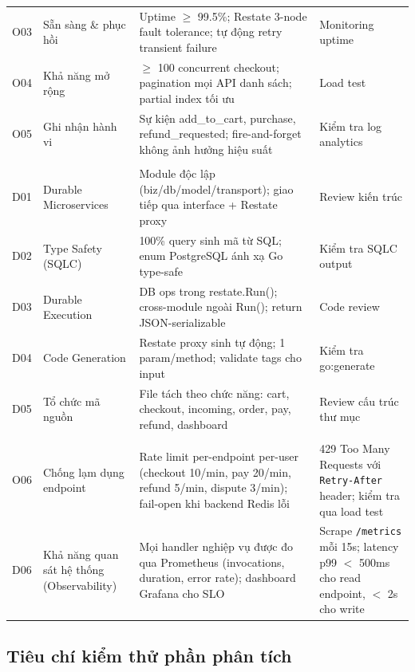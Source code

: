 \begin{longtable}{@{} c L{2.8cm} L{5cm} L{5cm} @{}}
O03 & Sẵn sàng \& phục hồi & Uptime $\geq$ 99.5\%; Restate 3-node fault tolerance; tự động retry transient failure & Monitoring uptime \\
O04 & Khả năng mở rộng & $\geq$ 100 concurrent checkout; pagination mọi API danh sách; partial index tối ưu & Load test \\
O05 & Ghi nhận hành vi & Sự kiện add\_to\_cart, purchase, refund\_requested; fire-and-forget không ảnh hưởng hiệu suất & Kiểm tra log analytics \\
 \\
D01 & Durable Microservices & Module độc lập (biz/db/model/transport); giao tiếp qua interface + Restate proxy & Review kiến trúc \\
D02 & Type Safety (SQLC) & 100\% query sinh mã từ SQL; enum PostgreSQL ánh xạ Go type-safe & Kiểm tra SQLC output \\
D03 & Durable Execution & DB ops trong restate.Run(); cross-module ngoài Run(); return JSON-serializable & Code review \\
D04 & Code Generation & Restate proxy sinh tự động; 1 param/method; validate tags cho input & Kiểm tra go:generate \\
D05 & Tổ chức mã nguồn & File tách theo chức năng: cart, checkout, incoming, order, pay, refund, dashboard & Review cấu trúc thư mục \\
 \\
O06 & Chống lạm dụng endpoint & Rate limit per-endpoint per-user (checkout 10/min, pay 20/min, refund 5/min, dispute 3/min); fail-open khi backend Redis lỗi & 429 Too Many Requests với \texttt{Retry-After} header; kiểm tra qua load test \\
D06 & Khả năng quan sát hệ thống (Observability) & Mọi handler nghiệp vụ được đo qua Prometheus (invocations, duration, error rate); dashboard Grafana cho SLO & Scrape \texttt{/metrics} mỗi 15s; latency p99 $<$ 500ms cho read endpoint, $<$ 2s cho write \\
\end{longtable}
\normalsize



\subsection{Tiêu chí kiểm thử phần phân tích}
\label{sec:analysis-test}

